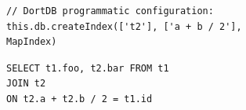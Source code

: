 \begin{figure}[htpb]
    \begin{subfigure}[b]{\textwidth}
    \begin{tcolorbox}[colback=white, colframe=black, boxrule=1pt, arc=0pt]
        \begin{verbatim}
// DortDB programmatic configuration:
this.db.createIndex(['t2'], ['a + b / 2'], MapIndex)
        \end{verbatim}
    \end{tcolorbox}
    \end{subfigure}

    \begin{subfigure}[b]{\textwidth}
    \begin{tcolorbox}[colback=white, colframe=black, boxrule=1pt, arc=0pt]
        \begin{verbatim}
SELECT t1.foo, t2.bar FROM t1
JOIN t2
ON t2.a + t2.b / 2 = t1.id
        \end{verbatim}
    \end{tcolorbox}
    \end{subfigure}

    \medskip


\end{figure}
